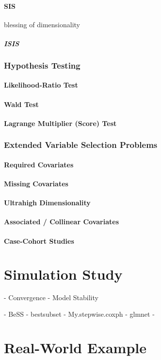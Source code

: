 \subsection{SIS}
blessing of dimensionality 
\subsubsection{ISIS}

\section{Hypothesis Testing}
\subsection{Likelihood-Ratio Test}
\subsection{Wald Test}
\subsection{Lagrange Multiplier (Score) Test}

\section{Extended Variable Selection Problems}
\subsection{Required Covariates}
\subsection{Missing Covariates}
\subsection{Ultrahigh Dimensionality}
\subsection{Associated / Collinear Covariates}
\subsection{Case-Cohort Studies}

\part{Simulation Study}
- Convergence
- Model Stability


- BeSS
- bestsubset
- My.stepwise.coxph
- glmnet
- 

\part{Real-World Example}
